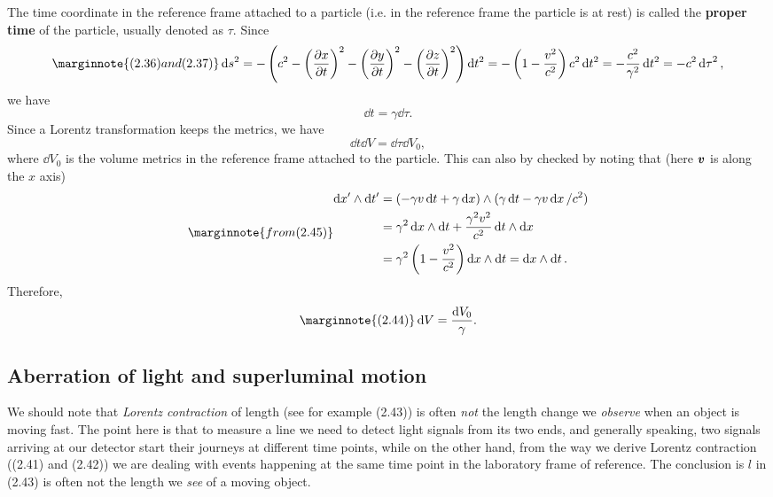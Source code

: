 \documentclass[hyperref, a4paper]{article}
\newcommand*{\concept}[1]{{\textbf{#1}}}
\begin{document}
The time coordinate in the reference frame attached to a particle (i.e. in the reference frame the particle 
is at rest) is called the \concept{proper time} of the particle, usually denoted as $\tau$.
Since 
\[ \marginnote{(2.36) and (2.37)}
    \dd{s^2} = - \left( c^2 - \left(\pdv{x}{t}\right)^2 - \left(\pdv{y}{t}\right)^2 - \left(\pdv{z}{t}\right)^2 \right) \dd{t^2} = - \left( 1 - \frac{v^2}{c^2} \right) c^2 \dd{t^2} = - \frac{c^2}{\gamma^2} \dd{t^2} = - c^2 \dd{\tau}^2,
\] 
we have 
\begin{equation}
    \dd{t} = \gamma \dd{\tau}.
\end{equation}
Since a Lorentz transformation keeps the metrics, we have 
\[
    \dd{t} \dd{V} = \dd{\tau} \dd{V_0},
\]
where $\dd{V_0}$ is the volume metrics in the reference frame attached to the particle. This can also by checked 
by noting that (here $\vb*{v}$ is along the $x$ axis)
\[ \marginnote{from (2.45)}
    \begin{aligned}
        \dd{x'} \wedge \dd{t'} &= (-\gamma v \dd{t} + \gamma \dd{x}) \wedge (\gamma \dd{t} - \gamma v \dd{x} / c^2) \\
        &= \gamma^2 \dd{x} \wedge \dd{t} + \frac{\gamma^2 v^2}{c^2} \dd{t} \wedge \dd{x} \\
        &= \gamma^2 \left( 1 - \frac{v^2}{c^2} \right) \dd{x} \wedge \dd{t} = \dd{x} \wedge \dd{t}.
    \end{aligned}
\]
Therefore, 
\begin{equation} \marginnote{(2.44)}
    \dd{V} = \frac{\dd{V_0}}{\gamma}.
\end{equation}

\subsection{Aberration of light and superluminal motion}

We should note that \emph{Lorentz contraction} of length (see for example (2.43)) is often \emph{not} 
 the length change we \emph{observe} when an object is moving fast.
The point here is that to measure a line we need to detect light signals from its two ends, and generally 
speaking, two signals arriving at our detector start their journeys at different time points, while on the 
other hand, from the way we derive Lorentz contraction ((2.41) and (2.42)) 
we are dealing with events happening at the same time point in the laboratory frame of reference. 
The conclusion is $l$ in (2.43) is often not the length we \emph{see} of a moving object.
\end{document}
